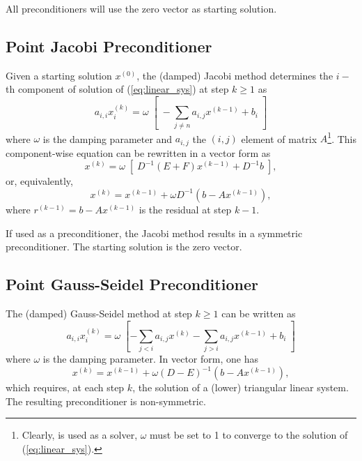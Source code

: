 
\medskip

\begin{remark}
All preconditioners will use the zero vector as starting solution.
\end{remark}

\subsection{Point Jacobi Preconditioner}
\label{sec:jacobi}

Given a starting solution $x^{(0)}$, the (damped) Jacobi method determines 
the $i-$th component of 
solution of (\ref{eq:linear_sys}) at step $k \geq 1$ as
\[
a_{i,i} x^{(k)}_i = \omega \; \left[  \;- \sum_{j \neq n} a_{i,j} x^{(k-1)} + b_i
\; \right]
\]
where $\omega$ is the damping parameter and
$a_{i,j}$ the $(i,j)$ element of matrix $A$\footnote{Clearly, is used as a
  solver, $\omega$ must be set to 1 to converge to the solution of
    (\ref{eq:linear_sys}).}.
This component-wise equation can be rewritten in a vector form as
\[
x^{(k)} = \omega \; \left[ \; D^{-1} (E+F) x ^{(k-1)} + D^{-1} b \; \right],
\]
or, equivalently,
\begin{equation}
\label{eq:jacobi}
x^{(k)} = x^{(k-1)} + \omega D^{-1} (b - A x ^{(k-1)} ) ,
\end{equation}
where $r^{(k-1)} = b - A x ^{(k-1)}$ is the residual at step $k-1$. 

If used as a preconditioner, the Jacobi method results in
a symmetric preconditioner.
The starting solution is the zero vector.

\subsection{Point Gauss-Seidel Preconditioner}
\label{sec:gs}

The (damped) Gauss-Seidel method at step $k \geq 1$ can be written as
\[
a_{i,i} x^{(k)}_i = \omega \; 
 \left[- \sum_{j<i} a_{i,j} x^{(k)} 
			   - \sum_{j>i} a_{i,j} x^{(k-1)} + b_i
			   \; \right]
\]
where $\omega$ is the damping parameter. In vector form, one has
\begin{equation}
\label{eq:gs}
x^{(k)} = x^{(k-1)} + \omega (D - E)^{-1} (b - A x ^{(k-1)} ) ,
\end{equation}
which requires, at each step $k$, the solution of a (lower) triangular 
linear system. The resulting preconditioner is non-symmetric.

